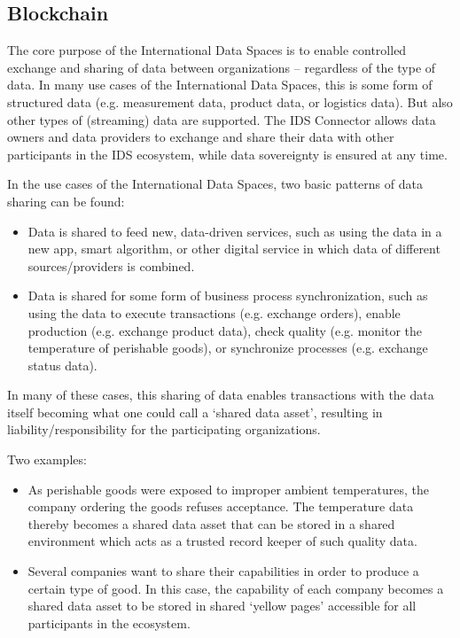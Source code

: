 \subsection{Blockchain}\label{subsec:blockchain}
The core purpose of the International Data Spaces is to enable controlled exchange and sharing of data between organizations – regardless of the type of data. In many use cases of the International Data Spaces, this is some form of structured data (e.g. measurement data, product data, or logistics data). But also other types of (streaming) data are supported. The IDS Connector allows data owners and data providers to exchange and share their data with other participants in the IDS ecosystem, while data sovereignty is ensured at any time. 

In the use cases of the International Data Spaces, two basic patterns of data sharing can be found: 

\begin{itemize}
	\item Data is shared to feed new, data-driven services, such as using the data in a new app, smart algorithm, or other digital service in which data of different sources/providers is combined. 

	\item Data is shared for some form of business process synchronization, such as using the data to execute transactions (e.g. exchange orders), enable production (e.g. exchange product data), check quality (e.g. monitor the temperature of perishable goods), or synchronize processes (e.g. exchange status data). 
\end{itemize}

In many of these cases, this sharing of data enables transactions with the data itself becoming what one could call a ‘shared data asset’, resulting in liability/responsibility for the participating organizations. 

Two examples: 

\begin{itemize}
	\item As perishable goods were exposed to improper ambient temperatures, the company ordering the goods refuses acceptance. The temperature data thereby becomes a shared data asset that can be stored in a shared environment which acts as a trusted record keeper of such quality data. 

	\item Several companies want to share their capabilities in order to produce a certain type of good. In this case, the capability of each company becomes a shared data asset to be stored in shared ‘yellow pages’ accessible for all participants in the ecosystem. 
\end{itemize}

